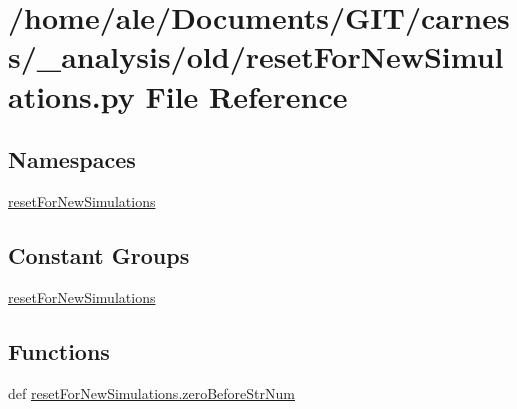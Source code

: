 \hypertarget{a00028}{\section{/home/ale/\-Documents/\-G\-I\-T/carness/\-\_\-analysis/old/reset\-For\-New\-Simulations.py File Reference}
\label{a00028}
}
\subsection*{Namespaces}
\begin{DoxyCompactItemize}
\item 
\hyperlink{a00115}{reset\-For\-New\-Simulations}
\end{DoxyCompactItemize}
\subsection*{Constant Groups}
\begin{DoxyCompactItemize}
\item 
\hyperlink{a00115}{reset\-For\-New\-Simulations}
\end{DoxyCompactItemize}
\subsection*{Functions}
\begin{DoxyCompactItemize}
\item 
def \hyperlink{a00115_aba1c55fe18d1a0b31b346994a7a96628}{reset\-For\-New\-Simulations.\-zero\-Before\-Str\-Num}
\end{DoxyCompactItemize}
